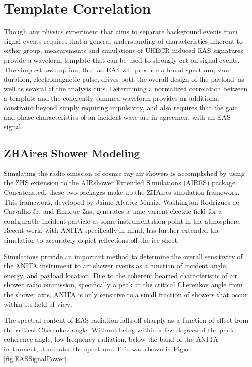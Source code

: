\section{Template Correlation}%
	Though any physics experiment that aims to separate background events from signal events requires that a general understanding of characteristics inherent to either group, measurements and simulations of UHECR induced EAS signatures provide a waveform template that can be used to strongly cut on signal events.  The simplest assumption, that an EAS will produce a broad spectrum, short duration, electromagnetic pulse, drives both the overall design of the payload, as well as several of the analysis cuts.  Determining a normalized correlation between a template and the coherently summed waveform provides an additional constraint beyond simply requiring impulsivity, and also requires that the gain and phase characteristics of an incident wave are in agreement with an EAS signal.

	\subsection{ZHAires Shower Modeling}
		Simulating the radio emission of cosmic ray air showers is accomplished by using the ZHS extension to the AIRshower Extended Simulations (AIRES) package.\cite{AlvarezMuñiz2012325}  Concatenated, these two packages make up the ZHAires simulation framework.  This framework, developed by Jaime Alvarez-Muniz, Washington Rodrigues de Carvalho Jr. and Enrique Zas, generates a time varient electric field for a configurable incident particle at some instrumentation point in the atmosphere.  Recent work, with ANITA specifically in mind, has further extended the simulation to accurately depict reflections off the ice sheet.
		
		Simulations provide an important method to determine the overall sensitivity of the ANITA instrument to air shower events as a function of incident angle, energy, and payload location.  Due to the coherent beamed characteristic of air shower radio emmission, specifically a peak at the critical Cherenkov angle from the shower axis, ANITA is only sensitive to a small fraction of showers that occur within its field of view.
		
		The spectral content of EAS radiation falls off sharply as a function of offset from the critical Cherenkov angle.  Without being within a few degrees of the peak coherence angle, low frequency radiation, below the band of the ANITA instrument, dominates the spectrum.  This was shown in Figure \ref{fig:EASSignalPower}

